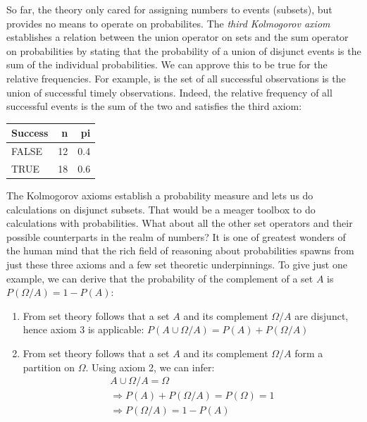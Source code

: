 \documentclass[]{svmono}
\newenvironment{Shaded}{\begin{snugshade}}{\end{snugshade}}
\newcommand{\KeywordTok}[1]{\textcolor[rgb]{0.13,0.29,0.53}{\textbf{#1}}}
\newcommand{\DataTypeTok}[1]{\textcolor[rgb]{0.13,0.29,0.53}{#1}}
\newcommand{\StringTok}[1]{\textcolor[rgb]{0.31,0.60,0.02}{#1}}
\newcommand{\OperatorTok}[1]{\textcolor[rgb]{0.81,0.36,0.00}{\textbf{#1}}}
\newcommand{\NormalTok}[1]{#1}
\begin{document}
So far, the theory only cared for assigning numbers to events (subsets),
but provides no means to operate on probabilites. The \emph{third
Kolmogorov axiom} establishes a relation between the union operator on
sets and the sum operator on probabilities by stating that the
probability of a union of disjunct events is the sum of the individual
probabilities. We can approve this to be true for the relative
frequencies. For example, is the set of all successful observations is
the union of successful timely observations. Indeed, the relative
frequency of all successful events is the sum of the two and satisfies
the third axiom:

\begin{Shaded}
\end{Shaded}

\begin{tabular}{l|r|r}
\hline
Success & n & pi\\
\hline
FALSE & 12 & 0.4\\
\hline
TRUE & 18 & 0.6\\
\hline
\end{tabular}

The Kolmogorov axioms establish a probability measure and lets us do
calculations on disjunct subsets. That would be a meager toolbox to do
calculations with probabilities. What about all the other set operators
and their possible counterparts in the realm of numbers? It is one of
greatest wonders of the human mind that the rich field of reasoning
about probabilities spawns from just these three axioms and a few set
theoretic underpinnings. To give just one example, we can derive that
the probability of the complement of a set \(A\) is
\(P(\Omega/A) = 1 - P(A)\):

\begin{enumerate}
\def\labelenumi{\arabic{enumi}.}
\item
  From set theory follows that a set \(A\) and its complement
  \(\Omega/A\) are disjunct, hence axiom 3 is applicable:
  \(P(A \cup \Omega/A) = P(A) + P(\Omega/A)\)
\item
  From set theory follows that a set \(A\) and its complement
  \(\Omega/A\) form a partition on \(\Omega\). Using axiom 2, we can
  infer: \[\begin{aligned}
  A \cup \Omega/A = \Omega\\ 
  \Rightarrow P(A) + P(\Omega/A) = P(\Omega) = 1\\ 
  \Rightarrow P(\Omega/A) = 1 - P(A)
  \end{aligned}\]
\end{enumerate}
\end{document}
